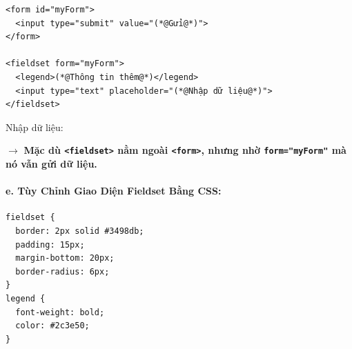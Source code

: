 \documentclass[11pt,oneside]{book}
\newcommand{\codeinline}[1]{\textcolor{accentOrange}{\texttt{#1}}}
\begin{document}
\vspace{6pt}

\begin{codeWindow}
\begin{lstlisting}[language=HTML5]
<form id="myForm">
  <input type="submit" value="(*@Gửi@*)">
</form>

<fieldset form="myForm">
  <legend>(*@Thông tin thêm@*)</legend>
  <input type="text" placeholder="(*@Nhập dữ liệu@*)">
</fieldset>
\end{lstlisting}
\end{codeWindow}

\begin{browserWindow}
\sffamily\small
{} \par\vspace{10pt}
\begin{tcolorbox}[
    enhanced, colback=white, colframe=gray!60, boxrule=0.6pt, arc=0pt,
    top=10pt, bottom=10pt, left=10pt, right=10pt,
    coltitle=darkText,
    title={\sffamily\small\textcolor{darkText}{Thông tin thêm}},
    attach boxed title to top left={xshift=10pt, yshift=-6pt},
    boxed title style={colback=white, colframe=white, boxrule=0pt, left=3pt, right=3pt, top=0pt, bottom=0pt}
]
Nhập dữ liệu: \quad {}
\end{tcolorbox}
\end{browserWindow}
\textcolor{primaryBlue}{\textbf{$\rightarrow$}} \textbf{Mặc dù \codeinline{<fieldset>} nằm ngoài \codeinline{<form>}, nhưng nhờ \codeinline{form="myForm"} mà nó vẫn gửi dữ liệu.}

\paragraph{e. Tùy Chỉnh Giao Diện Fieldset Bằng CSS:}
\begin{codeWindow}
\begin{lstlisting}[language=CSS3]
fieldset {
  border: 2px solid #3498db;
  padding: 15px;
  margin-bottom: 20px;
  border-radius: 6px;
}
legend {
  font-weight: bold;
  color: #2c3e50;
}
\end{lstlisting}
\end{codeWindow}
\end{document}
